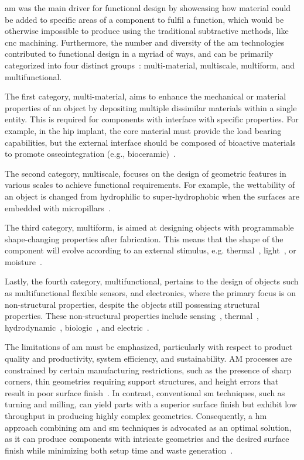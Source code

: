 \gls{am} was the main driver for functional design by showcasing how material
could be added to specific areas of a component to fulfil a function, which
would be otherwise impossible to produce using the traditional subtractive
methods, like \gls{cnc} machining.
Furthermore, the number and diversity of the \gls{am} technologies contributed
to functional design in a myriad of ways, and can be primarily categorized into
four distinct groups~\cite{leung2019challenges}: multi-material, multiscale, multiform, and multifunctional.

The first category, multi-material, aims to enhance the
mechanical or material properties of an object by depositing multiple dissimilar
materials within a single entity. This is required for components with
interface with specific properties. For example, in the hip
implant, the core material must provide the load bearing capabilities, but the
external interface should be composed of bioactive materials to promote
osseointegration (e.g., bioceramic)~\cite{rafiq2023MultiFunc-coatings-hip}.

The second category, multiscale, focuses on
the design of geometric features in various scales to achieve functional
requirements. For example, the wettability of an object is changed from
hydrophilic to super-hydrophobic when the surfaces are embedded with micropillars~\cite{yang20183d}.

The third category, multiform, is aimed at designing objects with
programmable shape-changing properties after fabrication. This means that the
shape of the component will evolve according to an external stimulus, e.g.
thermal~\cite{khoo20153d,chae2015four}, light~\cite{liu2017sequential}, or moisture~\cite{sydney2016biomimetic}.

Lastly, the fourth category, multifunctional, pertains to the design of objects
such as multifunctional flexible sensors, and electronics, 
where the primary focus is on non-structural properties, despite the objects still possessing
structural properties. These non-structural properties include sensing~\cite{senthil2019review},
thermal~\cite{tirado2021conductive, fornells2020integrated},
hydrodynamic~\cite{liu20223d}, biologic~\cite{freyman20203d}, and
electric~\cite{wajahat2022three, fu2020functional}.

The limitations of \gls{am} must be emphasized, particularly with respect to
product quality and productivity, system efficiency, and sustainability. AM
processes are constrained by certain manufacturing restrictions, such as the
presence of sharp corners, thin geometries requiring support structures, and
height errors that result in poor surface finish~\cite{danish2022experimental}. In contrast, conventional
\gls{sm} techniques, such as turning and milling, can yield parts with a
superior surface finish but exhibit low throughput in producing highly complex
geometries. Consequently, a \gls{hm} approach combining \gls{am} and \gls{sm} techniques is advocated as an optimal solution, as it can produce components with intricate geometries and the desired surface finish while minimizing both setup time and waste generation~\cite{hegab2023design, lauwers2014hybrid}.

